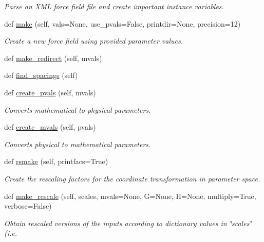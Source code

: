 \begin{DoxyCompactItemize}
\begin{DoxyCompactList}\small\item\em Parse an X\+ML force field file and create important instance variables. \end{DoxyCompactList}\item 
def \hyperlink{classsrc_1_1forcefield_1_1FF_a3bd84ef07970f78b17145ca790e819b7}{make} (self, vals=None, use\+\_\+pvals=False, printdir=None, precision=12)
\begin{DoxyCompactList}\small\item\em Create a new force field using provided parameter values. \end{DoxyCompactList}\item 
def \hyperlink{classsrc_1_1forcefield_1_1FF_abba6f0f0234c8d256bf991fefdd4f0a5}{make\+\_\+redirect} (self, mvals)
\item 
def \hyperlink{classsrc_1_1forcefield_1_1FF_a477e27c784066adde54ab153542bc2a5}{find\+\_\+spacings} (self)
\item 
def \hyperlink{classsrc_1_1forcefield_1_1FF_ad467744db1396ec74adab0c113317d36}{create\+\_\+pvals} (self, mvals)
\begin{DoxyCompactList}\small\item\em Converts mathematical to physical parameters. \end{DoxyCompactList}\item 
def \hyperlink{classsrc_1_1forcefield_1_1FF_a0f53b3814d92705db25a7d90c4dafca6}{create\+\_\+mvals} (self, pvals)
\begin{DoxyCompactList}\small\item\em Converts physical to mathematical parameters. \end{DoxyCompactList}\item 
def \hyperlink{classsrc_1_1forcefield_1_1FF_a4524aae9e3644c578766a36f220ef076}{rsmake} (self, printfacs=True)
\begin{DoxyCompactList}\small\item\em Create the rescaling factors for the coordinate transformation in parameter space. \end{DoxyCompactList}\item 
def \hyperlink{classsrc_1_1forcefield_1_1FF_ad677189d9a50ed30eaca7e85094ff19a}{make\+\_\+rescale} (self, scales, mvals=None, G=None, H=None, multiply=True, verbose=False)
\begin{DoxyCompactList}\small\item\em Obtain rescaled versions of the inputs according to dictionary values in \char`\"{}scales\char`\"{} (i.\+e. \end{DoxyCompactList}\item 

\end{DoxyCompactItemize}
